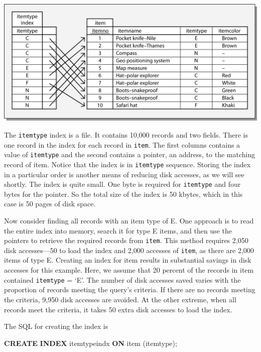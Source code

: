 \documentclass[
]{article}
\newenvironment{Shaded}{\begin{snugshade}}{\end{snugshade}}
\newcommand{\KeywordTok}[1]{\textcolor[rgb]{0.13,0.29,0.53}{\textbf{#1}}}
\newcommand{\NormalTok}[1]{#1}
\begin{document}
\includegraphics{Figures/Chapter 20/index.png}

The \texttt{itemtype} index is a file. It contains 10,000 records and two
fields. There is one record in the index for each record in \texttt{item}. The
first columns contains a value of \texttt{itemtype} and the second contains a
pointer, an address, to the matching record of item. Notice that the
index is in \texttt{itemtype} sequence. Storing the index in a particular order
is another means of reducing disk accesses, as we will see shortly. The
index is quite small. One byte is required for \texttt{itemtype} and four bytes
for the pointer. So the total size of the index is 50 kbytes, which in
this case is 50 pages of disk space.

Now consider finding all records with an item type of E. One approach is
to read the entire index into memory, search it for type E items, and
then use the pointers to retrieve the required records from \texttt{item}. This
method requires 2,050 disk accesses---50 to load the index and 2,000
accesses of \texttt{item}, as there are 2,000 items of type E. Creating an
index for item results in substantial savings in disk accesses for this
example. Here, we assume that 20 percent of the records in item
contained \texttt{itemtype} = `E'. The number of disk accesses saved varies
with the proportion of records meeting the query's criteria. If there
are no records meeting the criteria, 9,950 disk accesses are avoided. At
the other extreme, when all records meet the criteria, it takes 50 extra
disk accesses to load the index.

The SQL for creating the index is

\begin{Shaded}
\begin{Highlighting}[]
\KeywordTok{CREATE} \KeywordTok{INDEX}\NormalTok{ itemtypeindx }\KeywordTok{ON}\NormalTok{ item (itemtype);}
\end{Highlighting}
\end{Shaded}
\end{document}
